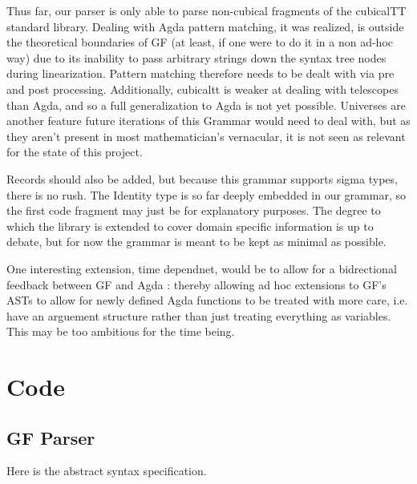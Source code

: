 \documentclass[11pt, a4paper]{article}
\begin{document}
Thus far, our parser is only able to parse non-cubical fragments of the
cubicalTT standard library. Dealing with Agda pattern matching, it was
realized, is outside the theoretical boundaries of GF (at least, if one were to
do it in a non ad-hoc way) due to its inability to pass arbitrary strings down
the syntax tree nodes during linearization. Pattern matching therefore needs to be dealt
with via pre and post processing.  Additionally, cubicaltt is weaker at
dealing with telescopes than Agda, and so a full generalization to Agda is not
yet possible. Universes are another feature future iterations of this Grammar
would need to deal with, but as they aren't present in most mathematician's
vernacular, it is not seen as relevant for the state of this project.

Records should also be added, but because this grammar supports sigma types,
there is no rush. The Identity type is so far deeply embedded in our grammar,
so the first code fragment may just be for explanatory purposes.  The degree to
which the library is extended to cover domain specific information is up to
debate, but for now the grammar is meant to be kept as minimal as possible.

One interesting extension, time dependnet, would be to allow for a bidrectional
feedback between GF and Agda : thereby allowing ad hoc extensions to GF's ASTs
to allow for newly defined Agda functions to be treated with more care, i.e.
have an arguement structure rather than just treating everything as variables.
This may be too ambitious for the time being.

\section{Code}

\subsection{GF Parser}

Here is the abstract syntax specification.
\end{document}
